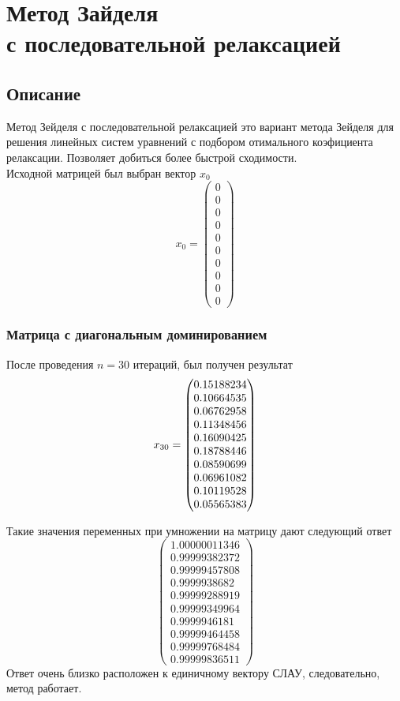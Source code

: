 \documentclass[../../report.tex]{subfiles}
\begin{document}
\chapter[Метод Зайделя с последовательной релаксацией]{\texorpdfstring{Метод Зайделя \\ 
с последовательной релаксацией}{Метод Зайделя с последовательной релаксацией}}

\section{Описание}
Метод Зейделя с последовательной релаксацией это вариант метода Зейделя для решения линейных систем уравнений с подбором отимального коэфициента релаксации. Позволяет добиться  более быстрой сходимости. \\
Исходной матрицей был выбран вектор $x_0$ 
\[
x_0 = \begin{pmatrix}
    0 \\ 
    0 \\ 
    0 \\ 
    0 \\ 
    0 \\ 
    0 \\ 
    0 \\ 
    0 \\ 
    0 \\ 
    0 
\end{pmatrix}
\]

\subsection{Матрица с диагональным доминированием}
После проведения $n=30$ итераций, был получен результат
\[
x_{30} = \begin{pmatrix} 0.15188234 \\ 0.10664535 \\ 0.06762958 \\ 0.11348456 \\ 0.16090425 \\ 0.18788446 \\ 0.08590699 \\ 0.06961082 \\ 0.10119528 \\ 0.05565383 \end{pmatrix}
\]

Такие значения переменных при умножении на матрицу дают следующий ответ
\[
\begin{pmatrix}
    1.00000011346 \\
    0.99999382372 \\
    0.99999457808 \\
    0.9999938682 \\
    0.99999288919 \\
    0.99999349964 \\
    0.9999946181 \\
    0.99999464458 \\
    0.99999768484 \\
    0.99999836511
\end{pmatrix}
\]
Ответ очень близко расположен к единичному вектору СЛАУ, следовательно, метод работает.
\end{document}
